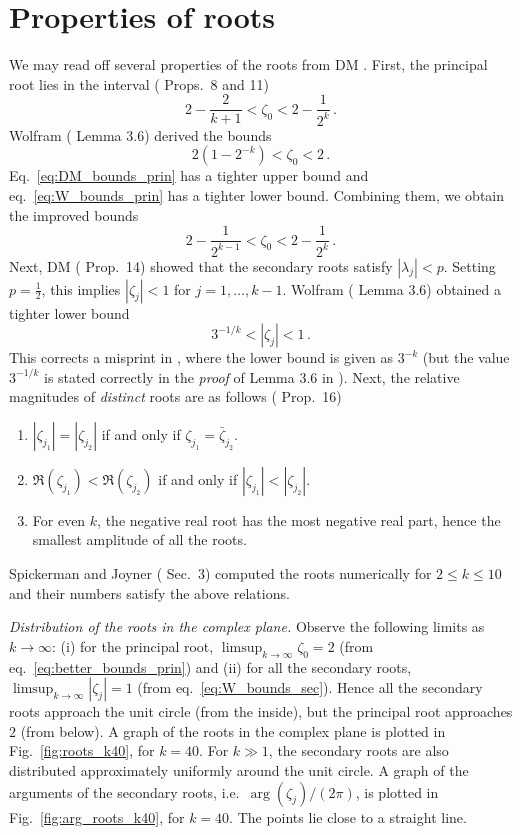 \documentclass[review]{elsarticle}
\theoremstyle{plain}
\begin{document}
\section{Properties of roots}\label{sec:proproots}
We may read off several properties of the roots from DM \cite{DM3}.
First, the principal root lies in the interval (\cite{DM3} Props.~8 and 11)   
\begin{equation}
\label{eq:DM_bounds_prin}
2 - \frac{2}{k+1} < \zeta_0 < 2 - \frac{1}{2^k} \,.
\end{equation}
Wolfram (\cite{Wolfram} Lemma 3.6) derived the bounds 
\begin{equation}
\label{eq:W_bounds_prin}
2(1-2^{-k}) < \zeta_0 < 2 \,.
\end{equation}
Eq.~\eqref{eq:DM_bounds_prin} has a tighter upper bound and
eq.~\eqref{eq:W_bounds_prin} has a tighter lower bound.
Combining them, we obtain the improved bounds
\begin{equation}
\label{eq:better_bounds_prin}
2 - \frac{1}{2^{k-1}} < \zeta_0 < 2 - \frac{1}{2^k} \,.
\end{equation}
Next, DM (\cite{DM3} Prop.~14) showed that the secondary roots satisfy $|\lambda_j|<p$.
Setting $p=\frac12$, this implies $|\zeta_j| < 1$ for $j=1,\dots,k-1$.
Wolfram (\cite{Wolfram} Lemma 3.6) obtained a tighter lower bound
\begin{equation}
\label{eq:W_bounds_sec}
  3^{-1/k} < |\zeta_j| < 1 \,.
\end{equation}
This corrects a misprint in \cite{Wolfram}, where the lower bound is given as $3^{-k}$
(but the value $3^{-1/k}$ is stated correctly in the \emph{proof} of Lemma 3.6 in \cite{Wolfram}).
Next, the relative magnitudes of \emph{distinct} roots are as follows (\cite{DM3} Prop.~16)
\begin{enumerate}
\item
  $|\zeta_{j_1}| = |\zeta_{j_2}|$ if and only if $\zeta_{j_1} = \bar{\zeta}_{j_2}$.
\item
  $\Re(\zeta_{j_1}) < \Re(\zeta_{j_2})$ if and only if $|\zeta_{j_1}| < |\zeta_{j_2}|$.  
\item
  For even $k$, the negative real root has the most negative
  real part, hence the smallest amplitude of all the roots.
\end{enumerate}
Spickerman and Joyner (\cite{SpickermanJoyner} Sec.~3) computed the roots numerically 
for $2\le k\le 10$ and their numbers satisfy the above relations.

\emph{Distribution of the roots in the complex plane.}
Observe the following limits as $k\to\infty$:
(i) for the principal root, $\limsup_{k\to\infty}\zeta_0=2$ (from eq.~\eqref{eq:better_bounds_prin}) and
(ii) for all the secondary roots, $\limsup_{k\to\infty}|\zeta_j|=1$ (from eq.~\eqref{eq:W_bounds_sec}).
Hence all the secondary roots approach the unit circle (from the inside),
but the principal root approaches $2$ (from below).
A graph of the roots in the complex plane is plotted in Fig.~\ref{fig:roots_k40}, for $k=40$.
For $k\gg1$, the secondary roots are also distributed approximately uniformly around the unit circle.
A graph of the arguments of the secondary roots, i.e.~$\arg(\zeta_j)/(2\pi)$,
is plotted in Fig.~\ref{fig:arg_roots_k40}, for $k=40$.
The points lie close to a straight line.
\end{document}
